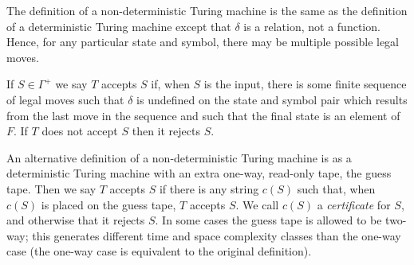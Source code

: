 \documentclass[12pt]{article}
\begin{document}
The definition of a non-deterministic Turing machine is the same as the definition of a deterministic Turing machine except that $\delta$ is a relation,  not a function.  Hence, for any particular state and symbol, there may be multiple possible legal moves.

If $S\in\Gamma^+$ we say $T$ accepts $S$ if, when $S$ is the input, there is some finite sequence of legal moves such that $\delta$ is undefined on the state and symbol pair which results from the last move in the sequence and such that the final state is an element of $F$.  If $T$ does not accept $S$ then it rejects $S$.

An alternative definition of a non-deterministic Turing machine is as a deterministic Turing machine with an extra one-way, read-only tape, the guess tape.  Then we say $T$ accepts $S$ if there is any string $c(S)$ such that, when $c(S)$ is placed on the guess tape, $T$ accepts $S$.  We call $c(S)$ a \emph{certificate} for $S$, and otherwise that it rejects $S$.  In some cases the guess tape is allowed to be two-way; this generates different time and space complexity classes than the one-way case (the one-way case is equivalent to the original definition).
\end{document}
